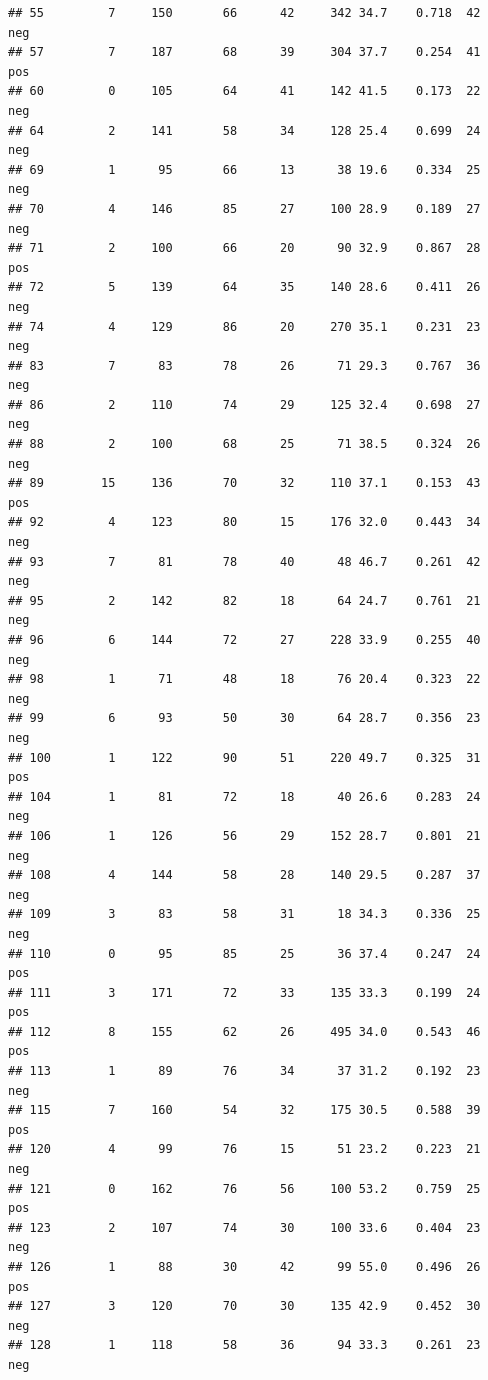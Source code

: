 \documentclass[
]{article}
\begin{document}
\begin{verbatim}
## 55         7     150       66      42     342 34.7    0.718  42      neg
## 57         7     187       68      39     304 37.7    0.254  41      pos
## 60         0     105       64      41     142 41.5    0.173  22      neg
## 64         2     141       58      34     128 25.4    0.699  24      neg
## 69         1      95       66      13      38 19.6    0.334  25      neg
## 70         4     146       85      27     100 28.9    0.189  27      neg
## 71         2     100       66      20      90 32.9    0.867  28      pos
## 72         5     139       64      35     140 28.6    0.411  26      neg
## 74         4     129       86      20     270 35.1    0.231  23      neg
## 83         7      83       78      26      71 29.3    0.767  36      neg
## 86         2     110       74      29     125 32.4    0.698  27      neg
## 88         2     100       68      25      71 38.5    0.324  26      neg
## 89        15     136       70      32     110 37.1    0.153  43      pos
## 92         4     123       80      15     176 32.0    0.443  34      neg
## 93         7      81       78      40      48 46.7    0.261  42      neg
## 95         2     142       82      18      64 24.7    0.761  21      neg
## 96         6     144       72      27     228 33.9    0.255  40      neg
## 98         1      71       48      18      76 20.4    0.323  22      neg
## 99         6      93       50      30      64 28.7    0.356  23      neg
## 100        1     122       90      51     220 49.7    0.325  31      pos
## 104        1      81       72      18      40 26.6    0.283  24      neg
## 106        1     126       56      29     152 28.7    0.801  21      neg
## 108        4     144       58      28     140 29.5    0.287  37      neg
## 109        3      83       58      31      18 34.3    0.336  25      neg
## 110        0      95       85      25      36 37.4    0.247  24      pos
## 111        3     171       72      33     135 33.3    0.199  24      pos
## 112        8     155       62      26     495 34.0    0.543  46      pos
## 113        1      89       76      34      37 31.2    0.192  23      neg
## 115        7     160       54      32     175 30.5    0.588  39      pos
## 120        4      99       76      15      51 23.2    0.223  21      neg
## 121        0     162       76      56     100 53.2    0.759  25      pos
## 123        2     107       74      30     100 33.6    0.404  23      neg
## 126        1      88       30      42      99 55.0    0.496  26      pos
## 127        3     120       70      30     135 42.9    0.452  30      neg
## 128        1     118       58      36      94 33.3    0.261  23      neg

\end{verbatim}
\end{document}
